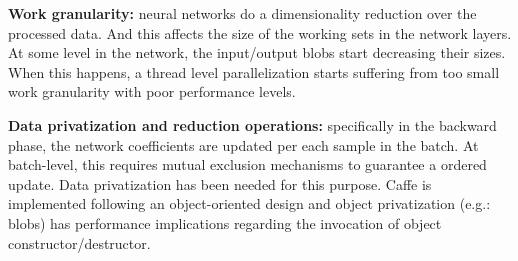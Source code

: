 \textbf{Work granularity:} neural networks do
a dimensionality reduction over the processed data.
And this affects the size of the working sets in the network layers.
At some level in the network, the input/output blobs start decreasing their sizes. When this happens, a thread level parallelization
starts suffering from too small work granularity with poor performance levels.

\textbf{Data privatization and reduction operations:} specifically in the
backward phase, the network coefficients are updated per each
sample in the batch. At batch-level, this requires mutual exclusion
mechanisms to guarantee a ordered update. Data privatization has
been needed for this purpose. Caffe is implemented following an
object-oriented design and object privatization (e.g.: blobs) 
has performance implications regarding the invocation of object 
constructor/destructor.


